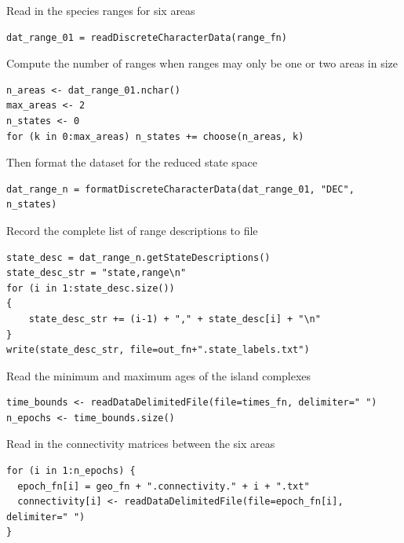 Read in the species ranges for six areas

\begin{snugshade}
\begin{lstlisting}
dat_range_01 = readDiscreteCharacterData(range_fn)
\end{lstlisting}
\end{snugshade}

Compute the number of ranges when ranges may only be one or two areas in size

\begin{snugshade}
\begin{lstlisting}
n_areas <- dat_range_01.nchar()
max_areas <- 2
n_states <- 0
for (k in 0:max_areas) n_states += choose(n_areas, k)
\end{lstlisting}
\end{snugshade}

Then format the dataset for the reduced state space

\begin{snugshade}
\begin{lstlisting}
dat_range_n = formatDiscreteCharacterData(dat_range_01, "DEC", n_states)
\end{lstlisting}
\end{snugshade}

Record the complete list of range descriptions to file

\begin{snugshade}
\begin{lstlisting}
state_desc = dat_range_n.getStateDescriptions()
state_desc_str = "state,range\n"
for (i in 1:state_desc.size())
{
    state_desc_str += (i-1) + "," + state_desc[i] + "\n"
}
write(state_desc_str, file=out_fn+".state_labels.txt")
\end{lstlisting}
\end{snugshade}

Read the minimum and maximum ages of the island complexes

\begin{snugshade}
\begin{lstlisting}
time_bounds <- readDataDelimitedFile(file=times_fn, delimiter=" ")
n_epochs <- time_bounds.size()
\end{lstlisting}
\end{snugshade}

Read in the connectivity matrices between the six areas

\begin{snugshade}
\begin{lstlisting}
for (i in 1:n_epochs) {
  epoch_fn[i] = geo_fn + ".connectivity." + i + ".txt"
  connectivity[i] <- readDataDelimitedFile(file=epoch_fn[i], delimiter=" ")
}
\end{lstlisting}
\end{snugshade}

